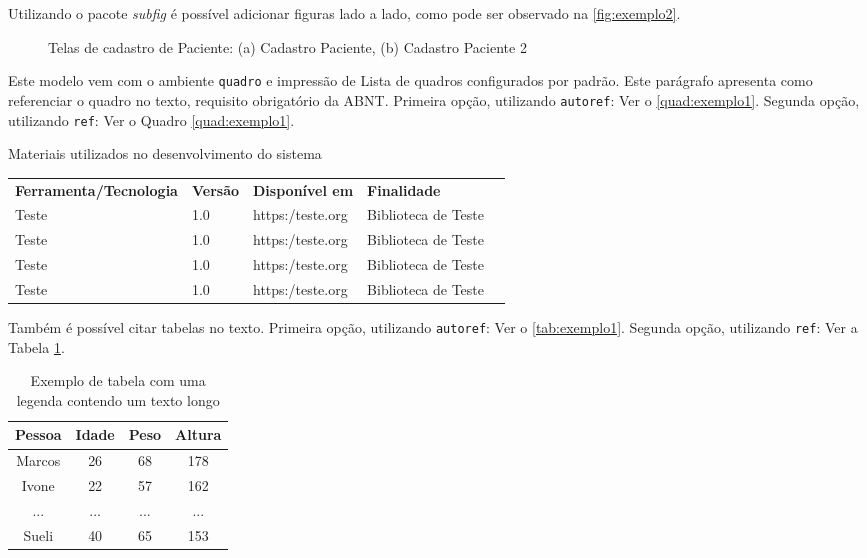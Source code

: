 Utilizando o pacote \textit{subfig} é possível adicionar figuras lado a lado, como pode ser observado na \autoref{fig:exemplo2}.

\begin{figure}[htb]
    \caption{Telas de cadastro de Paciente: (a) Cadastro Paciente, (b) Cadastro Paciente 2} 
	\label{fig:exemplo2}
	\centering
	\hspace{0.15cm} 
	
	\fonte{}
\end{figure}

Este modelo vem com o ambiente \texttt{quadro} e impressão de Lista de quadros 
configurados por padrão.  Este parágrafo apresenta como referenciar o quadro no texto, requisito obrigatório da ABNT. Primeira opção, utilizando \texttt{autoref}: Ver o \autoref{quad:exemplo1}. Segunda opção, utilizando  \texttt{ref}: Ver o Quadro \ref{quad:exemplo1}.

\begin{tabframed}[htb]%
\caption{Materiais utilizados no desenvolvimento do sistema}%
\label{quad:exemplo1}%
\renewcommand{\arraystretch}{1.5}
\begin{tabular}{|l|l|l|l|l}
\cline{1-4}
\textbf{Ferramenta/Tecnologia} & \textbf{Versão} & \textbf{Disponível em} & \textbf{Finalidade} \\ \cline{1-4}
 Teste & 1.0  & https:/teste.org & Biblioteca de Teste & \\ \cline{1-4}  
 Teste & 1.0  & https:/teste.org & Biblioteca de Teste & \\ \cline{1-4}
 Teste & 1.0  & https:/teste.org & Biblioteca de Teste & \\ \cline{1-4}
 Teste & 1.0  & https:/teste.org & Biblioteca de Teste & \\ \cline{1-4}
\end{tabular}
\fonte{}%
\end{tabframed}


Também é possível citar tabelas no texto. Primeira opção, utilizando \texttt{autoref}: Ver o \autoref{tab:exemplo1}. Segunda opção, utilizando  \texttt{ref}: Ver a Tabela \ref{tab:exemplo1}.

\begin{table}[htb]
\centering
\caption{\label{tab:exemplo1}Exemplo de tabela com uma legenda contendo um texto longo}
\begin{tabular}{cccc}
	\hline
	\textbf{Pessoa} & \textbf{Idade} & \textbf{Peso} & \textbf{Altura} \\ \hline
	Marcos & 26    & 68   & 178    \\ 
	Ivone  & 22    & 57   & 162    \\ 
	...    & ...   & ...  & ...    \\ 
	Sueli  & 40    & 65   & 153    \\ \hline
\end{tabular}
\fonte{}
\end{table}

